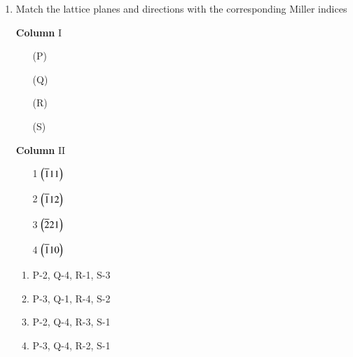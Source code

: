 \documentclass[journal]{IEEEtran}
\numberwithin{equation}{enumi}
\numberwithin{figure}{enumi}
\begin{document}
\begin{enumerate}
	\item Match the lattice planes and directions  with the corresponding Miller indices 
		\begin{multicols}{2}
			\textbf{Column} $\mathrm{I}$ 
			\begin{enumerate}
				\item[(P)] 
					\centering
					\resizebox{0.35\columnwidth}{!}{}
				\item[(Q)]
                                        \centering
                                        \resizebox{0.35\columnwidth}{!}{}
				\item[(R)]
                                        \centering
                                	\resizebox{0.35\columnwidth}{!}{}
				\item[(S)]
                                        \centering
                                        \resizebox{0.35\columnwidth}{!}{}
			\end{enumerate}
			\columnbreak
			\textbf{Column} $\mathrm{II}$
			\begin{enumerate}
				\item[1] $\left(\overline{1}11\right)$
				\item[2] $\left(\overline{1}12\right)$
				\item[3] $\left(\overline{2}21\right)$
				\item[4] $\left(\overline{1}10\right)$
			\end{enumerate}
		\end{multicols}

		\hfill{}

		\begin{enumerate}
			\item P-2, Q-4, R-1, S-3 
			\item P-3, Q-1, R-4, S-2
			\item P-2, Q-4, R-3, S-1
			\item P-3, Q-4, R-2, S-1
		\end{enumerate}


\end{enumerate}
\end{document}
